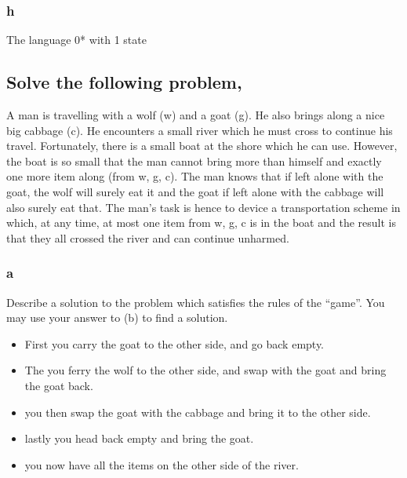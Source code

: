 \documentclass[a4paper,10pt,titlepage]{report}
\begin{document}
\subsubsection{h}
The language 0* with 1 state \\



\subsection{Solve the following problem,}

A man is travelling with a wolf (w) and a goat (g). He also brings along a nice big
cabbage (c). He encounters a small river which he must cross to continue his travel.
Fortunately, there is a small boat at the shore which he can use. However, the boat
is so small that the man cannot bring more than himself and exactly one more item
along (from {w, g, c}). The man knows that if left alone with the goat, the wolf will
surely eat it and the goat if left alone with the cabbage will also surely eat that. The
man’s task is hence to device a transportation scheme in which, at any time, at most
one item from {w, g, c} is in the boat and the result is that they all crossed the river
and can continue unharmed.

\subsubsection{a} Describe a solution to the problem which satisfies the rules of the “game”. You may use your answer to (b) to find a solution. \\

\begin{itemize}
\item First you carry the goat to the other side, and go back empty.
\item The you ferry the wolf to the other side, and swap with the goat and bring the goat back.
\item you then swap the goat with the cabbage and bring it to the other side.
\item lastly you head back empty and bring the goat.
\item you now have all the items on the other side of the river.
\end{itemize}
\end{document}
